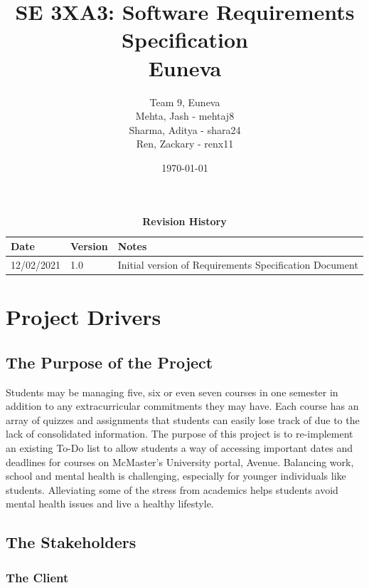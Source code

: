 \documentclass[12pt, titlepage]{article}
\title{SE 3XA3: Software Requirements Specification\\Euneva}
\author{Team 9, Euneva
		\\ Mehta, Jash - mehtaj8
		\\ Sharma, Aditya - shara24
		\\ Ren, Zackary - renx11
}
\date{\today}
\begin{document}
\maketitle

\tableofcontents
\listoftables
\listoffigures

\begin{table}[bp]
\caption{\bf Revision History}
\begin{tabularx}{\textwidth}{p{3cm}p{2cm}X}
\toprule {\bf Date} & {\bf Version} & {\bf Notes}\\
\midrule
12/02/2021 & 1.0 & Initial version of Requirements Specification Document\\
\bottomrule
\end{tabularx}
\end{table}

\newpage


\section{Project Drivers}

\subsection{The Purpose of the Project}

Students may be managing five, six or even seven courses in one semester in addition to any extracurricular commitments they may have. Each course has an array of quizzes and assignments that students can easily lose track of due to the lack of consolidated information. The purpose of this project is to re-implement an existing To-Do list to allow students a way of accessing important dates and deadlines for courses on McMaster’s University portal, Avenue. Balancing work, school and mental health is challenging, especially for younger individuals like students. Alleviating some of the stress from academics helps students avoid mental health issues and live a healthy lifestyle. 

\subsection{The Stakeholders}

\subsubsection{The Client}
\end{document}
